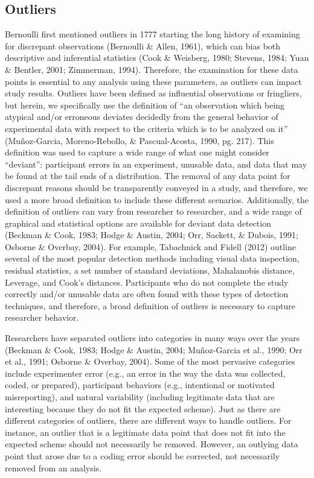 \documentclass[english,,man]{apa6}
\theoremstyle{definition}
\theoremstyle{definition}
\theoremstyle{definition}
\theoremstyle{remark}
\begin{document}
\subsection{Outliers}\label{outliers}

Bernoulli first mentioned outliers in 1777 starting the long history of
examining for discrepant observations (Bernoulli \& Allen, 1961), which
can bias both descriptive and inferential statistics (Cook \& Weisberg,
1980; Stevens, 1984; Yuan \& Bentler, 2001; Zimmerman, 1994). Therefore,
the examination for these data points is essential to any analysis using
these parameters, as outliers can impact study results. Outliers have
been defined as influential observations or fringliers, but herein, we
specifically use the definition of \enquote{an observation which being
atypical and/or erroneous deviates decidedly from the general behavior
of experimental data with respect to the criteria which is to be
analyzed on it} (Muñoz-Garcia, Moreno-Rebollo, \& Pascual-Acosta, 1990,
pg. 217). This definition was used to capture a wide range of what one
might consider \enquote{deviant}: participant errors in an experiment,
unusable data, and data that may be found at the tail ends of a
distribution. The removal of any data point for discrepant reasons
should be transparently conveyed in a study, and therefore, we used a
more broad definition to include these different scenarios.
Additionally, the definition of outliers can vary from researcher to
researcher, and a wide range of graphical and statistical options are
available for deviant data detection (Beckman \& Cook, 1983; Hodge \&
Austin, 2004; Orr, Sackett, \& Dubois, 1991; Osborne \& Overbay, 2004).
For example, Tabachnick and Fidell (2012) outline several of the most
popular detection methods including visual data inspection, residual
statistics, a set number of standard deviations, Mahalanobis distance,
Leverage, and Cook's distances. Participants who do not complete the
study correctly and/or unusable data are often found with these types of
detection techniques, and therefore, a broad definition of outliers is
necessary to capture researcher behavior.

Researchers have separated outliers into categories in many ways over
the years (Beckman \& Cook, 1983; Hodge \& Austin, 2004; Muñoz-Garcia et
al., 1990; Orr et al., 1991; Osborne \& Overbay, 2004). Some of the most
pervasive categories include experimenter error (e.g., an error in the
way the data was collected, coded, or prepared), participant behaviors
(e.g., intentional or motivated misreporting), and natural variability
(including legitimate data that are interesting because they do not fit
the expected scheme). Just as there are different categories of
outliers, there are different ways to handle outliers. For instance, an
outlier that is a legitimate data point that does not fit into the
expected scheme should not necessarily be removed. However, an outlying
data point that arose due to a coding error should be corrected, not
necessarily removed from an analysis.
\end{document}

